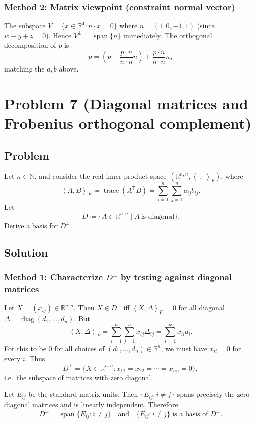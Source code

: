 \documentclass[12pt]{article}
\newcommand{\df}{\coloneqq}
\newcommand{\R}{\mathbb{R}}
\DeclareMathOperator{\Span}{span}
\DeclareMathOperator{\tr}{trace}
\DeclareMathOperator{\diag}{diag}
\newcommand{\ip}[2]{\left\langle #1,#2\right\rangle}
\begin{document}
\subsubsection{Method 2: Matrix viewpoint (constraint normal vector)}
The subspace $V=\{x\in\R^4: n\cdot x=0\}$ where $n=(1,0,-1,1)$ (since $w-y+z=0$).
Hence $V^\perp=\Span\{n\}$ immediately. The orthogonal decomposition of $p$ is
\[
p=\left(p-\frac{p\cdot n}{n\cdot n}n\right)+\frac{p\cdot n}{n\cdot n}n,
\]
matching the $a,b$ above.

\newpage
\section{Problem 7 (Diagonal matrices and Frobenius orthogonal complement)}
\subsection{Problem}
Let $n\in\mathbb{N}$, and consider the real inner product space $(\R^{n,n},\ip{\cdot}{\cdot}_F)$, where
\[
\ip{A}{B}_F\df \tr(A^{\mathsf T}B)=\sum_{i=1}^n\sum_{j=1}^n a_{ij}b_{ij}.
\]
Let
\[
D\df \{A\in\R^{n,n}\mid A\ \text{is diagonal}\}.
\]
Derive a basis for $D^\perp$.

\subsection{Solution}

\subsubsection{Method 1: Characterize $D^\perp$ by testing against diagonal matrices}
Let $X=(x_{ij})\in\R^{n,n}$. Then $X\in D^\perp$ iff $\ip{X}{\Delta}_F=0$ for all diagonal $\Delta=\diag(d_1,\dots,d_n)$.
But
\[
\ip{X}{\Delta}_F=\sum_{i=1}^n\sum_{j=1}^n x_{ij}\Delta_{ij}=\sum_{i=1}^n x_{ii}d_i.
\]
For this to be $0$ for all choices of $(d_1,\dots,d_n)\in\R^n$, we must have $x_{ii}=0$ for every $i$.
Thus
\[
D^\perp=\{X\in\R^{n,n}: x_{11}=x_{22}=\cdots=x_{nn}=0\},
\]
i.e.\ the subspace of matrices with zero diagonal.

Let $E_{ij}$ be the standard matrix units. Then $\{E_{ij}: i\neq j\}$ spans precisely the zero-diagonal matrices and is linearly independent.
Therefore
\[
\boxed{\,D^\perp=\Span\{E_{ij}: i\neq j\}\quad\text{and}\quad \{E_{ij}: i\neq j\}\ \text{is a basis of }D^\perp.\,}
\]
\end{document}
